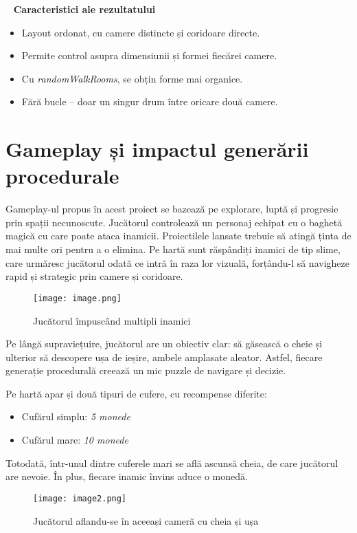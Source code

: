 \documentclass{article}
\begin{document}
  \newline
\textbf{Caracteristici ale rezultatului}
\begin{itemize}
	\item Layout ordonat, cu camere distincte și coridoare directe.
	\item Permite control asupra dimensiunii și formei fiecărei camere.
	\item Cu \textit{randomWalkRooms}, se obțin forme mai organice.
	\item Fără bucle – doar un singur drum între oricare două camere.
\end{itemize}
\newpage
	\section{Gameplay și impactul generării procedurale}
	
		\tab Gameplay-ul propus în acest proiect se bazează pe explorare, luptă și progresie prin spații necunoscute.
		Jucătorul controlează un personaj echipat cu o baghetă magică cu care poate ataca inamicii. Proiectilele lansate trebuie să atingă ținta de mai multe ori pentru a o elimina. Pe hartă sunt răspândiți inamici de tip slime, care urmăresc jucătorul odată ce intră în raza lor vizuală, forțându-l să navigheze rapid și strategic prin camere și coridoare.


		\begin{figure}[H]
			\centering
			\texttt{[image: image.png]}
			\caption{Jucătorul împuscând multipli inamici}
		\end{figure}
		
		
		Pe lângă supraviețuire, jucătorul are un obiectiv clar: să găsească o cheie și ulterior să descopere ușa de ieșire, ambele amplasate aleator. Astfel, fiecare generație procedurală creează un mic puzzle de navigare și decizie.
		
		Pe hartă apar și două tipuri de cufere, cu recompense diferite:
		\begin{itemize}
			\item Cufărul simplu: \textit{5 monede}
			\item Cufărul mare: \textit{10 monede}
		\end{itemize}
		Totodată, într-unul dintre cuferele mari se află ascunsă cheia, de care jucătorul are nevoie.
		În plus, fiecare inamic învins aduce o monedă. 
				\begin{figure}[H]
			\centering
			\texttt{[image: image2.png]}
			\caption{Jucătorul aflandu-se în aceeași cameră cu cheia și ușa}
		\end{figure}
		
\end{document}
